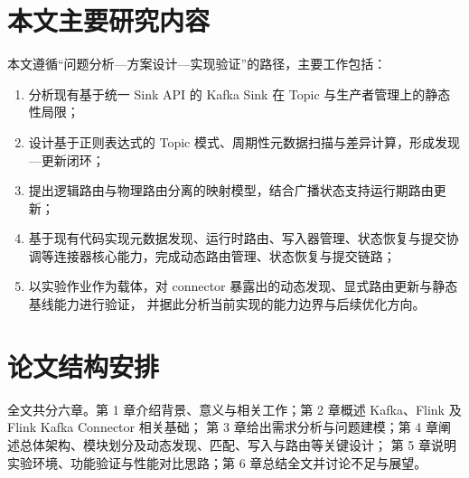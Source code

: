 \section{本文主要研究内容}

本文遵循“问题分析—方案设计—实现验证”的路径，主要工作包括：
\begin{enumerate}
  \item 分析现有基于统一 Sink API 的 Kafka Sink 在 Topic 与生产者管理上的静态性局限\cite{flinkUnifiedSink,flinkKafkaDocs}；
  \item 设计基于正则表达式的 Topic 模式、周期性元数据扫描与差异计算，形成发现—更新闭环；
  \item 提出逻辑路由与物理路由分离的映射模型，结合广播状态支持运行期路由更新；
  \item 基于现有代码实现元数据发现、运行时路由、写入器管理、状态恢复与提交协调等连接器核心能力，完成动态路由管理、状态恢复与提交链路；
  \item 以实验作业作为载体，对 connector 暴露出的动态发现、显式路由更新与静态基线能力进行验证，
        并据此分析当前实现的能力边界与后续优化方向。
\end{enumerate}

\section{论文结构安排}

全文共分六章。第 1 章介绍背景、意义与相关工作；第 2 章概述 Kafka、Flink 及 Flink Kafka Connector 相关基础；
第 3 章给出需求分析与问题建模；第 4 章阐述总体架构、模块划分及动态发现、匹配、写入与路由等关键设计；
第 5 章说明实验环境、功能验证与性能对比思路；第 6 章总结全文并讨论不足与展望。
